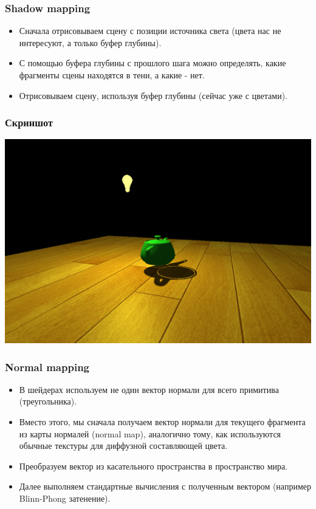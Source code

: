 \documentclass{beamer}
\begin{document}
\begin{frame}
	\frametitle{Shadow mapping}
	
	\begin{itemize}
		\item<1-> Сначала отрисовываем сцену с позиции источника света (цвета нас не интересуют, а только буфер глубины).
		\item<1-> С помощью буфера глубины с прошлого шага можно определять, какие фрагменты сцены находятся в тени, а какие - нет.
		\item<1-> Отрисовываем сцену, используя буфер глубины (сейчас уже с цветами).
	\end{itemize}
\end{frame}

\begin{frame}
	\frametitle{Скриншот}
	\begin{center}
		\includegraphics[scale=0.28]{scene5.png} 
	\end{center}
\end{frame}

\begin{frame}
	\frametitle{Normal mapping}
	
	\begin{itemize}
		\item<1-> В шейдерах используем не один вектор нормали для всего примитива (треугольника).
		\item<1-> Вместо этого, мы сначала получаем вектор нормали для текущего фрагмента из карты нормалей (normal map), аналогично тому, как используются обычные текстуры для диффузной составляющей цвета.
		\item<1-> Преобразуем вектор из касательного пространства в пространство мира.
		\item<1-> Далее выполняем стандартные вычисления с полученным вектором (например Blinn-Phong затенение).
	\end{itemize}
\end{frame}
\end{document}
